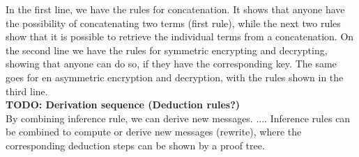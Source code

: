 \bigbreak
\noindent In the first line, we have the rules for concatenation. It shows that anyone have the possibility of concatenating two terms (first rule), while the next two rules show that it is possible to retrieve the individual terms from a concatenation. 
On the second line we have the rules for symmetric encrypting and decrypting, showing that anyone can do so, if they have the corresponding key. The same goes for en asymmetric encryption and decryption, with the rules shown in the third line. \\

\noindent \textbf{TODO: Derivation sequence (Deduction rules?)} \\
By combining inference rule, we can derive new messages. .... 
Inference rules can be combined to compute or derive new messages (rewrite), where the corresponding deduction steps can be shown by a proof tree. 
 




